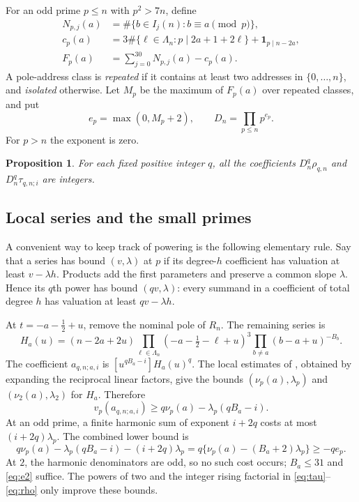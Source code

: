 \documentclass[11pt]{article}
\newtheorem{proposition}[theorem]{Proposition}
\theoremstyle{remark}
\newcommand{\ind}{\mathbf1}
\numberwithin{equation}{section}
\begin{document}
For an odd prime $p\le n$ with $p^2>7n$, define
\begin{align*}
 N_{p,j}(a)&=\#\{b\in I_j(n):b\equiv a\pmod p\},\\
 c_p(a)&=3\#\{\ell\in\Lambda_n:p\mid2a+1+2\ell\}
                                  +\ind_{p\mid n-2a},\\
 F_p(a)&=\sum_{j=0}^{30}N_{p,j}(a)-c_p(a).
\end{align*}
A pole-address class is \emph{repeated} if it contains at least two
addresses in $\{0,\ldots,n\}$, and \emph{isolated} otherwise.
Let $M_p$ be the maximum of $F_p(a)$ over repeated classes, and put
\begin{equation}\label{eq:elarge}
 e_p=\max(0,M_p+2),\qquad
 D_n=\prod_{p\le n}p^{e_p}.
\end{equation}
For $p>n$ the exponent is zero.

\begin{proposition}\label{prop:clear}
For each fixed positive integer $q$, all the coefficients
$D_n^q\rho_{q,n}$ and $D_n^q\tau_{q,n;i}$ are integers.
\end{proposition}

\subsection{Local series and the small primes}

A convenient way to keep track of powering is the following elementary
rule. Say that a series has bound $(v,\lambda)$ at $p$ if its
degree-$h$ coefficient has valuation at least $v-\lambda h$.
Products add the first parameters and preserve a common slope
$\lambda$. Hence its $q$th power has bound $(qv,\lambda)$:
every summand in a coefficient of total degree $h$ has valuation
at least $qv-\lambda h$.

At $t=-a-\tfrac12+u$, remove the nominal pole of $R_n$. The remaining
series is
\begin{equation}\label{eq:local}
 H_a(u)=(n-2a+2u)
 \prod_{\ell\in\Lambda_n}(-a-\tfrac12-\ell+u)^3
 \prod_{b\ne a}(b-a+u)^{-B_b}.
\end{equation}
The coefficient $a_{q,n;a,i}$ is
$[u^{qB_a-i}]H_a(u)^q$.
The local estimates of \cite[Appendix~A]{fifteen}, obtained by
expanding the reciprocal linear factors, give the bounds
$(\nu_p(a),\lambda_p)$ and $(\nu_2(a),\lambda_2)$ for $H_a$.
Therefore
\begin{equation}\label{eq:poweredlocal}
 v_p(a_{q,n;a,i})\ge q\nu_p(a)-\lambda_p(qB_a-i).
\end{equation}
At an odd prime, a finite harmonic sum of exponent $i+2q$
costs at most $(i+2q)\lambda_p$. The combined lower bound is
\[
 q\nu_p(a)-\lambda_p(qB_a-i)-(i+2q)\lambda_p
 =q\{\nu_p(a)-(B_a+2)\lambda_p\}\ge-qe_p.
\]
At $2$, the harmonic denominators are odd, so no such cost occurs;
$B_a\le31$ and \eqref{eq:e2} suffice. The powers of two and the
integer rising factorial in \eqref{eq:tau}--\eqref{eq:rho}
only improve these bounds.
\end{document}
